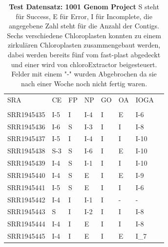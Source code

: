 \documentclass{scrartcl}
\begin{document}
\begin{table}[!h]
\caption[Test Datensatz: 1001 Genom Project, 11 Datensätze]{\textbf{Test Datensatz: 1001 Genom Project} S steht für Success, E für Error, I für Incomplete, die angegebene Zahl steht für die Anzahl der Contigs. Sechs verschiedene Chloroplasten konnten zu einem zirkulären Chloroplasten zusammengebaut werden, dabei werden bereits fünf vom fast-plast abgedeckt und einer wird von chloroExtractor beigesteuert. Felder mit einem "-" wurden Abgebrochen da sie nach einer Woche noch nicht fertig waren.}

\begin{center}
\begin{tabular}{llllllll}
SRA & CE & FP & NP & GO & OA & IOGA & \\
 &  &  &  &  &  &  & \\
\hline
SRR1945435 & I-5 & I & I-4 & I & E & I-6 & \\
SRR1945436 & I-6 & S & I-3 & I & I & I-8 & \\
SRR1945437 & I-5 & I & I-4 & I & I & I-10 & \\
SRR1945438 & S-3 & S & I-6 & I & E & I-10 & \\
SRR1945439 & I-4 & S & I-1 & I & I & I-10 & \\
SRR1945440 & I-4 & S & E & I & E & I-9 & \\
SRR1945441 & I-5 & S & E & I & I & I-6 & \\
SRR1945442 & I-4 & I & I-1 & I & - & - & \\
SRR1945443 & S & I & I-2 & I & I & I-8 & \\
SRR1945444 & I-4 & I & E & I & I & I-8 & \\
SRR1945445 & I-4 & I & E & I & E & I\_7 & \\
\end{tabular}
\end{center}
\end{table}
\end{document}
